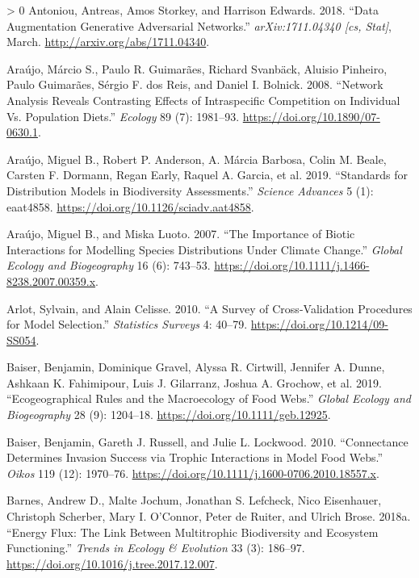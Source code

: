 \documentclass[11pt]{article}
\newlength{\cslhangindent}
\newenvironment{CSLReferences}[3] %
 {%
  \setlength{\parindent}{0pt}
  \ifodd #1 \everypar{\setlength{\hangindent}{\cslhangindent}}\ignorespaces\fi
  \ifnum #2 > 0
  \setlength{\parskip}{#2\baselineskip}
  \fi
 }%
 {}
\begin{document}
\begin{CSLReferences}{1}{0}
\leavevmode\hypertarget{ref-Antoniou2018DatAug}{}%
Antoniou, Antreas, Amos Storkey, and Harrison Edwards. 2018. {``Data
Augmentation Generative Adversarial Networks.''} \emph{arXiv:1711.04340
{[}cs, Stat{]}}, March. \url{http://arxiv.org/abs/1711.04340}.

\leavevmode\hypertarget{ref-Araujo2008NetAna}{}%
Araújo, Márcio S., Paulo R. Guimarães, Richard Svanbäck, Aluisio
Pinheiro, Paulo Guimarães, Sérgio F. dos Reis, and Daniel I. Bolnick.
2008. {``Network Analysis Reveals Contrasting Effects of Intraspecific
Competition on Individual Vs. Population Diets.''} \emph{Ecology} 89
(7): 1981--93. \url{https://doi.org/10.1890/07-0630.1}.

\leavevmode\hypertarget{ref-Araujo2019StaDis}{}%
Araújo, Miguel B., Robert P. Anderson, A. Márcia Barbosa, Colin M.
Beale, Carsten F. Dormann, Regan Early, Raquel A. Garcia, et al. 2019.
{``Standards for Distribution Models in Biodiversity Assessments.''}
\emph{Science Advances} 5 (1): eaat4858.
\url{https://doi.org/10.1126/sciadv.aat4858}.

\leavevmode\hypertarget{ref-Araujo2007ImpBio}{}%
Araújo, Miguel B., and Miska Luoto. 2007. {``The Importance of Biotic
Interactions for Modelling Species Distributions Under Climate
Change.''} \emph{Global Ecology and Biogeography} 16 (6): 743--53.
\url{https://doi.org/10.1111/j.1466-8238.2007.00359.x}.

\leavevmode\hypertarget{ref-Arlot2010SurCro}{}%
Arlot, Sylvain, and Alain Celisse. 2010. {``A Survey of Cross-Validation
Procedures for Model Selection.''} \emph{Statistics Surveys} 4: 40--79.
\url{https://doi.org/10.1214/09-SS054}.

\leavevmode\hypertarget{ref-Baiser2019EcoRul}{}%
Baiser, Benjamin, Dominique Gravel, Alyssa R. Cirtwill, Jennifer A.
Dunne, Ashkaan K. Fahimipour, Luis J. Gilarranz, Joshua A. Grochow, et
al. 2019. {``Ecogeographical Rules and the Macroecology of Food Webs.''}
\emph{Global Ecology and Biogeography} 28 (9): 1204--18.
\url{https://doi.org/10.1111/geb.12925}.

\leavevmode\hypertarget{ref-Baiser2010ConDet}{}%
Baiser, Benjamin, Gareth J. Russell, and Julie L. Lockwood. 2010.
{``Connectance Determines Invasion Success via Trophic Interactions in
Model Food Webs.''} \emph{Oikos} 119 (12): 1970--76.
\url{https://doi.org/10.1111/j.1600-0706.2010.18557.x}.

\leavevmode\hypertarget{ref-Barnes2018EneFlu}{}%
Barnes, Andrew D., Malte Jochum, Jonathan S. Lefcheck, Nico Eisenhauer,
Christoph Scherber, Mary I. O'Connor, Peter de Ruiter, and Ulrich Brose.
2018a. {``Energy Flux: The Link Between Multitrophic Biodiversity and
Ecosystem Functioning.''} \emph{Trends in Ecology \& Evolution} 33 (3):
186--97. \url{https://doi.org/10.1016/j.tree.2017.12.007}.


\end{CSLReferences}
\end{document}
